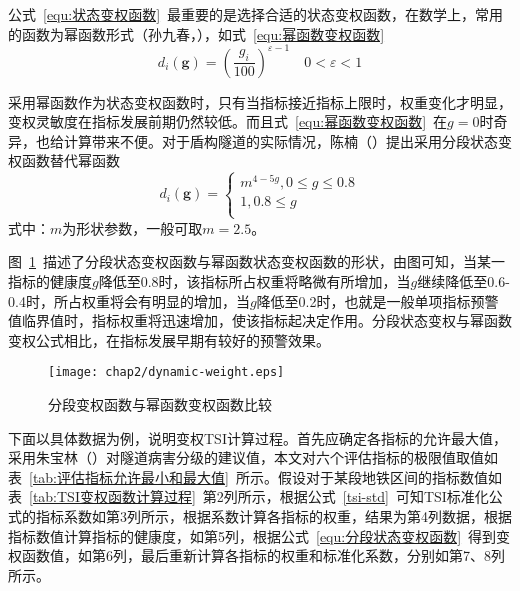 公式~\ref{equ:状态变权函数}~最重要的是选择合适的状态变权函数，在数学上，常用的函数为幂函数形式（孙九春，\citeyear{孙九春2002大型桥梁综合评估系统研究}），如式~\ref{equ:幂函数变权函数}
\begin{equation}
    \label{equ:幂函数变权函数}
    {{d}_{i}}(\mathbf{g})={{(\frac{{{g}_{i}}}{100})}^{\varepsilon -1}}\quad 0<\varepsilon <1
\end{equation}

采用幂函数作为状态变权函数时，只有当指标接近指标上限时，权重变化才明显，变权灵敏度在指标发展前期仍然较低。而且式~\ref{equ:幂函数变权函数}~在$g=0$时奇异，也给计算带来不便。对于盾构隧道的实际情况，陈楠（\citeyear{陈楠2017考虑发展趋势与指标关联的隧道结构健康评估方法研究}）提出采用分段状态变权函数替代幂函数
\begin{equation}
    \label{equ:分段状态变权函数}
    {{d}_{i}}(\mathbf{g})=\left\{ \begin{array}{*{35}{l}}
   {{m}^{4-5g}},0\le g\le 0.8  \\
   1,0.8\le g  \\
\end{array} \right.
\end{equation}
式中：$m$为形状参数，一般可取$m=2.5$。

图~\ref{fig:分段变权函数与幂函数变权函数比较}~描述了分段状态变权函数与幂函数状态变权函数的形状，由图可知，当某一指标的健康度$g$降低至0.8时，该指标所占权重将略微有所增加，当$g$继续降低至0.6-0.4时，所占权重将会有明显的增加，当$g$降低至0.2时，也就是一般单项指标预警值临界值时，指标权重将迅速增加，使该指标起决定作用。分段状态变权与幂函数变权公式相比，在指标发展早期有较好的预警效果。

\begin{figure}[htbp]
    \centering
    \texttt{[image: chap2/dynamic-weight.eps]}
    \caption{分段变权函数与幂函数变权函数比较}
    \label{fig:分段变权函数与幂函数变权函数比较}
\end{figure}

下面以具体数据为例，说明变权TSI计算过程。首先应确定各指标的允许最大值，采用朱宝林（\citeyear{朱宝林2014运营地铁盾构隧道状态评估及预测方法研究}）对隧道病害分级的建议值，本文对六个评估指标的极限值取值如表~\ref{tab:评估指标允许最小和最大值}~所示。假设对于某段地铁区间的指标数值如表~\ref{tab:TSI变权函数计算过程}~第2列所示，根据公式~\ref{tsi-std}~可知TSI标准化公式的指标系数如第3列所示，根据系数计算各指标的权重，结果为第4列数据，根据指标数值计算指标的健康度，如第5列，根据公式~\ref{equ:分段状态变权函数}~得到变权函数值，如第6列，最后重新计算各指标的权重和标准化系数，分别如第7、8列所示。

